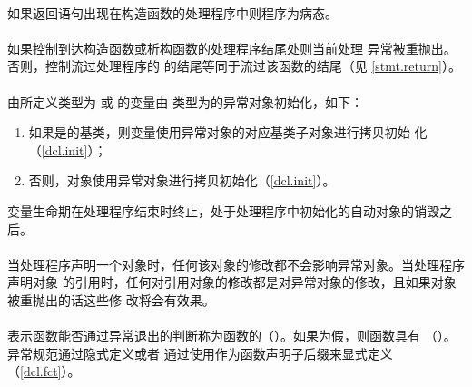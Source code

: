 \paragraph{}
如果返回语句出现在构造函数的处理程序中则程序为病态。

\paragraph{}
如果控制到达构造函数或析构函数的处理程序结尾处则当前处理
异常被重抛出。否则，控制流过处理程序的
的结尾等同于流过该函数的结尾（见
\ref{stmt.return}）。

\paragraph{}
由所定义类型为 或 的变量由
类型为的异常对象初始化，如下：
\begin{enumerate}
  \item{如果是的基类，则变量使用异常对象的对应基类子对象进行拷贝初始
    化（\ref{dcl.init}）；}
  \item{否则，对象使用异常对象进行拷贝初始化（\ref{dcl.init}）。}
\end{enumerate}
变量生命期在处理程序结束时终止，处于处理程序中初始化的自动对象的销毁之后。

\paragraph{}
当处理程序声明一个对象时，任何该对象的修改都不会影响异常对象。当处理程序声明对象
的引用时，任何对引用对象的修改都是对异常对象的修改，且如果对象被重抛出的话这些修
改将会有效果。

\paragraph{}
表示函数能否通过异常退出的判断称为函数的（）。如果为假，则函数具有
（）。异常规范通过隐式定义或者
通过使用作为函数声明子后缀来显式定义（\ref{dcl.fct}）。


